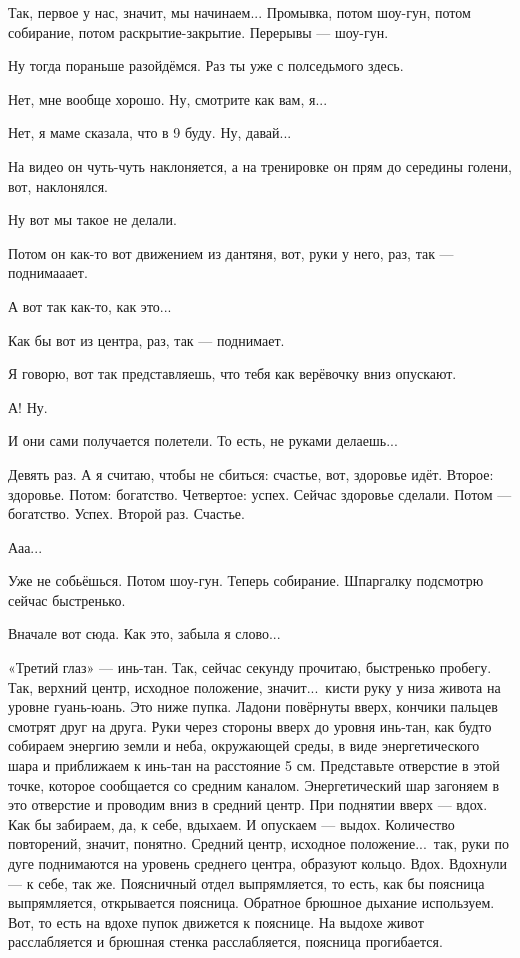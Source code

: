 \I
Так, первое у нас,
значит, мы начинаем... Промывка, потом
шоу-гун, потом собирание, потом раскрытие-закрытие. Перерывы --- шоу-гун.

\M
Ну тогда пораньше разойдёмся. Раз ты уже с полседьмого здесь.

\I
Нет, мне вообще хорошо. Ну, смотрите как вам, я...

\M
Нет, я маме сказала, что в 9 буду. Ну, давай...

\I
На видео он чуть-чуть наклоняется, а на тренировке он прям до середины голени, вот, наклонялся.

\M
Ну вот мы такое
не делали.

\I
Потом он как-то вот движением из дантяня, вот, руки у него, раз, так --- поднимааает.

\M
А вот так как-то, как это...

\I
Как бы вот из центра, раз, так --- поднимает.

\M
Я говорю, вот так представляешь, что тебя как верёвочку вниз опускают.

\I
А! Ну.

\M
И они сами получается полетели.
То есть, не руками делаешь...

\I
Девять раз. А я считаю, чтобы
не сбиться: счастье, вот, здоровье идёт. Второе: здоровье. Потом: богатство. Четвертое: успех.
Сейчас здоровье сделали. Потом --- богатство.
Успех. Второй раз. Счастье.

\M
Ааа...

\I
Уже не собьёшься.
Потом шоу-гун.
Теперь собирание. Шпаргалку подсмотрю сейчас быстренько.

\M
Вначале вот сюда. Как это, забыла я слово...

\I
«Третий глаз» --- инь-тан. Так, сейчас секунду прочитаю, быстренько пробегу.
Так, верхний центр, исходное положение, значит...\ кисти руку у низа
живота на уровне гуань-юань. Это ниже пупка.
Ладони повёрнуты вверх, кончики пальцев смотрят друг на друга.
Руки через стороны вверх до уровня инь-тан, как будто собираем энергию земли и неба,
окружающей среды, в виде энергетического шара и приближаем к инь-тан на расстояние 5 см.
Представьте отверстие в
этой точке, которое сообщается со средним каналом.
Энергетический шар загоняем в это отверстие и проводим вниз в средний центр.
При поднятии вверх --- вдох.
Как бы забираем, да, к себе, вдыхаем. И опускаем --- выдох.
Количество повторений, значит, понятно.
Средний центр, исходное положение...\ так, руки по дуге поднимаются на уровень среднего центра,
образуют кольцо. Вдох. Вдохнули --- к себе, так же.
Поясничный отдел выпрямляется, то есть, как бы поясница выпрямляется, открывается поясница.
Обратное брюшное дыхание используем.
Вот, то есть на вдохе пупок движется к пояснице.
На выдохе живот расслабляется
и брюшная стенка
расслабляется, поясница прогибается.

